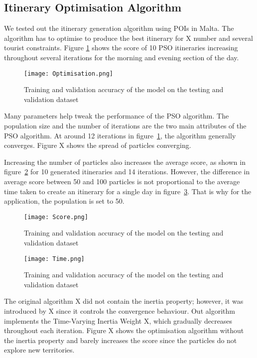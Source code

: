 \subsection{Itinerary Optimisation Algorithm}

We tested out the itinerary generation algorithm using
POIs in Malta. The algorithm has to optimise to
produce the best itinerary for X number and several
tourist constraints. Figure \ref{optimise} shows the score of 10
PSO itineraries increasing throughout several
iterations for the morning and evening section of the
day.

\begin{figure}[h]
\centering
\texttt{[image: Optimisation.png]}
\caption{Training and validation accuracy of the model on the testing and validation dataset}
\label{optimise}
\end{figure}

Many parameters help tweak the performance of the PSO
algorithm. The population size and the number of
iterations are the two main attributes of the PSO
algorithm. At around 12 iterations in figure~\ref{optimise}, the
algorithm generally converges. Figure X shows the
spread of particles converging. 


Increasing the number of particles also increases the
average score, as shown in figure~\ref{score} for 10 generated
itineraries and 14 iterations. However, the difference
in average score between 50 and 100 particles is not
proportional to the average time taken to create an
itinerary for a single day in figure~\ref{time}.  That is why
for the application, the population is set to 50. 

\begin{figure}[h]
\centering
\texttt{[image: Score.png]}
\caption{Training and validation accuracy of the model on the testing and validation dataset}
\label{score}
\end{figure}

\begin{figure}[h]
\centering
\texttt{[image: Time.png]}
\caption{Training and validation accuracy of the model on the testing and validation dataset}
\label{time}
\end{figure}

The original algorithm X did not contain the inertia
property; however, it was introduced by X since it
controls the convergence behaviour. Out algorithm
implements the Time-Varying Inertia Weight X, which
gradually decreases throughout each iteration. Figure
X shows the optimisation algorithm without the inertia
property and barely increases the score since the
particles do not explore new territories.
